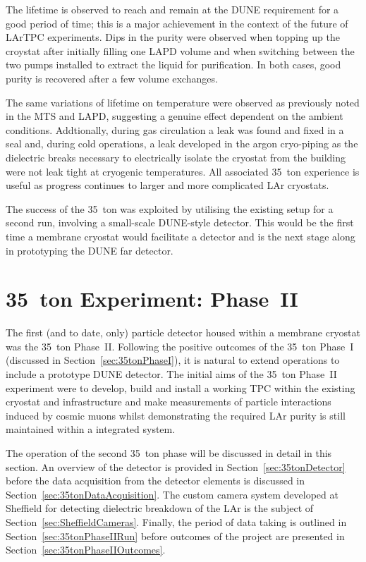 The lifetime is observed to reach and remain at the DUNE requirement for a good period of time; this is a major achievement in the context of the future of LArTPC experiments.  Dips in the purity were observed when topping up the croystat after initially filling one LAPD volume and when switching between the two pumps installed to extract the liquid for purification.  In both cases, good purity is recovered after a few volume exchanges.

The same variations of lifetime on temperature were observed as previously noted in the MTS and LAPD, suggesting a genuine effect dependent on the ambient conditions.  Addtionally, during gas circulation a leak was found and fixed in a seal and, during cold operations, a leak developed in the argon cryo-piping as the dielectric breaks necessary to electrically isolate the cryostat from the building were not leak tight at cryogenic temperatures.  All associated 35~ton experience is useful as progress continues to larger and more complicated LAr cryostats.

The success of the 35~ton was exploited by utilising the existing setup for a second run, involving a small-scale DUNE-style detector.  This would be the first time a membrane cryostat would facilitate a detector and is the next stage along in prototyping the DUNE far detector.

\section{35~ton Experiment: Phase~II}\label{sec:35tonPhaseII}

The first (and to date, only) particle detector housed within a membrane cryostat was the 35~ton Phase~II.  Following the positive outcomes of the 35~ton Phase~I (discussed in Section~\ref{sec:35tonPhaseI}), it is natural to extend operations to include a prototype DUNE detector.  The initial aims of the 35~ton Phase~II experiment were to develop, build and install a working TPC within the existing cryostat and infrastructure and make measurements of particle interactions induced by cosmic muons whilst demonstrating the required LAr purity is still maintained within a integrated system.

The operation of the second 35~ton phase will be discussed in detail in this section.  An overview of the detector is provided in Section~\ref{sec:35tonDetector} before the data acquisition from the detector elements is discussed in Section~\ref{sec:35tonDataAcquisition}.  The custom camera system developed at Sheffield for detecting dielectric breakdown of the LAr is the subject of Section~\ref{sec:SheffieldCameras}.  Finally, the period of data taking is outlined in Section~\ref{sec:35tonPhaseIIRun} before outcomes of the project are presented in Section~\ref{sec:35tonPhaseIIOutcomes}.

